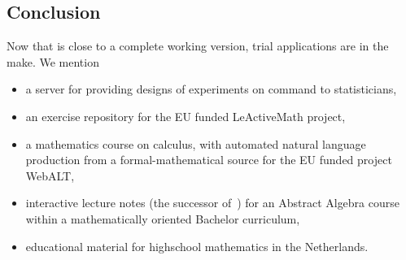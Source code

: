 \subsection{Conclusion}
Now that {\MathDox} is close to a complete working version, trial applications are in the
make. We mention
\begin{itemize}
\item a server for providing designs of experiments on command to statisticians,
\item an exercise repository for the EU funded LeActiveMath project,
\item a mathematics course on calculus, with automated natural language production from a
  formal-mathematical source for the EU funded project WebALT,
\item interactive lecture notes (the successor of~\cite{CohCuySterk:ida99}) for an
  Abstract Algebra course within a mathematically oriented Bachelor curriculum,
\item educational material for highschool mathematics in the Netherlands.
\end{itemize}












